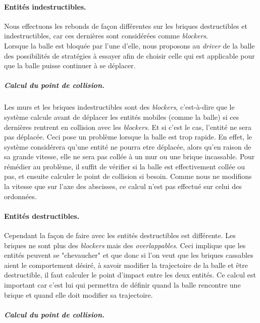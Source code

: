 \documentclass[a4paper,10pt]{article}
\begin{document}
        \paragraph{Entités indestructibles.}
        Nous effectuons les rebonds de façon
        différentes sur les briques destructibles et indestructibles, car ces dernières sont considérées comme \textit{blockers}. \\
        Lorsque la balle est bloquée par l'une d'elle, nous proposons au \textit{driver} de la balle des possibilités
        de stratégies à essayer afin de choisir celle qui est applicable pour que la balle puisse continuer à se déplacer.

		\subparagraph{Calcul du point de collision.}
            Les murs et les briques indestructibles sont des \textit{blockers}, c'est-à-dire que le système calcule avant de
            déplacer les entités mobiles (comme la balle) si ces dernières rentrent en collision avec les \textit{blockers}.
            Et si c'est le cas, l'entité ne sera pas déplacée. Ceci pose un problème lorsque la balle est trop rapide. En
            effet, le système considérera qu'une entité ne pourra etre déplacée, alors qu'en raison de sa grande vitesse,
            elle ne sera pas collée à un mur ou une brique incassable. Pour rémédier au problème, il suffit de vérifier si
            la balle est effectivement collée ou pas, et ensuite calculer le point de collision si besoin.
            Comme nous ne modifions la vitesse que sur l'axe des abscisses, ce calcul n'est pas effectué sur celui des
            ordonnées.

        \paragraph{Entités destructibles.}
		Cependant la façon de faire avec les entités destructibles est différente. Les briques ne sont plus des \textit{blockers}
		mais des \textit{overlappables}. Ceci implique que les entités peuvent se "chevaucher" et que donc si l'on veut que les
		briques cassables aient le comportement désiré, à savoir modifier la trajectoire de la balle et être destructible, il faut
		calculer le point d'impact entre les deux entités. Ce calcul est important car c'est lui qui permettra de définir
		quand la balle rencontre une brique et quand elle doit modifier sa trajectoire.

		\subparagraph{Calcul du point de collision.}
\end{document}
